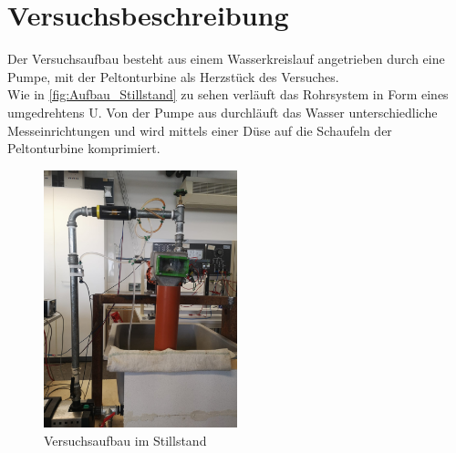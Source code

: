 \section{Versuchsbeschreibung}
\label{section:Versuchsbeschreibung}
%
Der Versuchsaufbau besteht aus einem Wasserkreislauf angetrieben durch eine Pumpe, mit der Peltonturbine als Herzstück des Versuches.\\
Wie in \autoref{fig:Aufbau_Stillstand} zu sehen verläuft das Rohrsystem in Form eines umgedrehtens U.
Von der Pumpe aus durchläuft das Wasser unterschiedliche Messeinrichtungen und wird mittels einer Düse auf die Schaufeln der Peltonturbine komprimiert.\\
%
\begin{figure}[!ht]
    \centering
    \includegraphics[width=0.5\textwidth]{Abbildungen/Aufbau Pelton.jpeg}
    \caption{Versuchsaufbau im Stillstand}
    \label{fig:Aufbau_Stillstand}
\end{figure}

